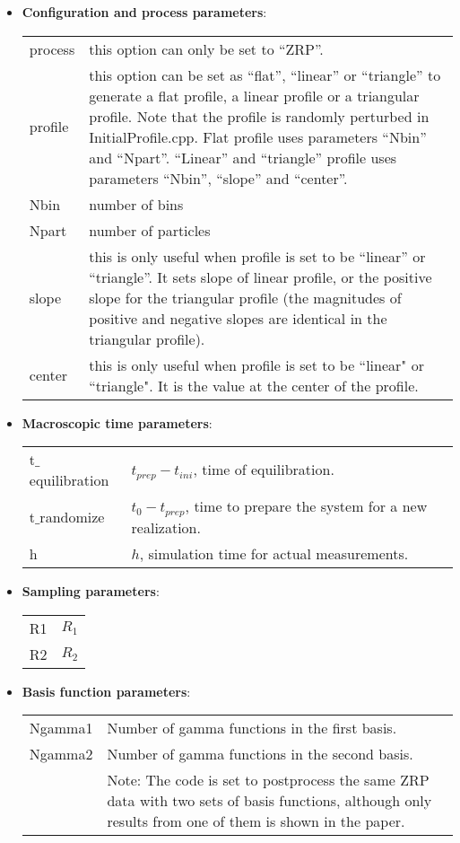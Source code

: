 \documentclass[authoryear,3p,11pt]{elsarticle}
\begin{document}
\begin{itemize}

\item {\bf Configuration and process parameters}:\\
\begin{tabular}{ p{2.2cm} p{12.5cm} }
  process & this option can only be set to ``ZRP''. \\
  profile & this option can be set as ``flat'', ``linear'' or ``triangle'' to generate a flat profile, a linear profile or a triangular profile. Note that the profile is randomly perturbed in InitialProfile.cpp. Flat profile uses parameters ``Nbin'' and ``Npart''. ``Linear'' and ``triangle'' profile uses parameters ``Nbin'', ``slope'' and ``center''.\\
    Nbin & number of bins  \\
  Npart & number of particles  \\
  slope & this is only useful when profile is set to be ``linear'' or ``triangle''. It sets slope of linear profile, or the positive slope for the triangular profile (the magnitudes of positive and negative slopes are identical in the triangular profile).\\
center & this is only useful when profile is set to be ``linear" or ``triangle". It is the value at the center of the profile.
\end{tabular}

\item {\bf Macroscopic time parameters}: \\
\begin{tabular}{p{2.2cm} p{12.5cm}  }
  t$\_$equilibration &  $t_{prep}-t_{ini}$, time of equilibration. \\
  t$\_$randomize &   $t_0 - t_{prep}$, time to prepare the system for a new realization.\\
  h & $h$, simulation time for actual measurements.\\
\end{tabular}

\item {\bf Sampling parameters}:\\
\begin{tabular}{p{2.2cm} p{12.5cm}  }
 R1 &  $R_1$ \\
 R2 &   $R_2$\\
\end{tabular}

\item {\bf Basis function parameters}:\\
\begin{tabular}{p{2.2cm} p{12.5cm}  }
Ngamma1 & Number of gamma functions in the first basis.\\
Ngamma2 & Number of gamma functions in the second basis.\\
&  Note: The code is set to postprocess the same ZRP data with two sets of basis functions, although only results from one of them is shown in the paper.
\end{tabular}


\end{itemize}
\end{document}
